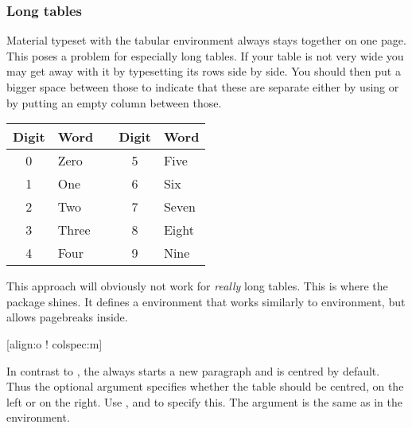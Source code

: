 \subsubsection{Long tables}

Material typeset with the tabular environment always stays together on one
page. This poses a problem for especially long tables. If your table is not
very wide you may get away with it by typesetting its rows side by side. You
should then put a bigger space between those to indicate that these are
separate either by using  or by putting an empty column between
those.
\begin{example}[examplewidth=0.4\linewidth]
\begin{tabular}{@{}cllcl@{}}
  \toprule
  Digit & Word  && Digit & Word  \\
  \midrule
  0     & Zero  && 5     & Five  \\
  1     & One   && 6     & Six   \\
  2     & Two   && 7     & Seven \\
  3     & Three && 8     & Eight \\
  4     & Four  && 9     & Nine  \\
  \bottomrule
\end{tabular}
\end{example}

This approach will obviously not work for \emph{really} long tables. This is
where the  package shines. It defines a 
environment that works similarly to  environment, but allows
pagebreaks inside.

\begin{lscommand}
  [align:o ! colspec:m]
\end{lscommand}
In contrast to , the  always starts a new paragraph
and is centred by default. Thus the optional argument  specifies
whether the table should be centred, on the left or on the right. Use
,  and  to specify this. The  argument
is the same as in the  environment.

